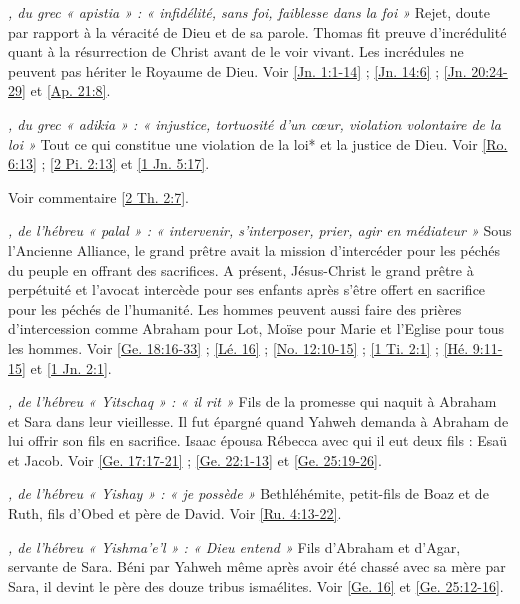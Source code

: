 \begin{multicols}{2}
\textit{, du grec « apistia » : « infidélité, sans foi, faiblesse dans la foi »}\newline
Rejet, doute par rapport à la véracité de Dieu et de sa parole. Thomas fit preuve d'incrédulité quant à la résurrection de Christ avant de le voir vivant. Les incrédules ne peuvent pas hériter le Royaume de Dieu. Voir \vref{Jn. 1:1-14} ; \vref{Jn. 14:6} ; \vref{Jn. 20:24-29} et \vref{Ap. 21:8}.

\textit{, du grec « adikia » : « injustice, tortuosité d'un cœur, violation volontaire de la loi »}\newline
Tout ce qui constitue une violation de la loi* et la justice de Dieu. Voir \vref{Ro. 6:13} ; \vref{2 Pi. 2:13} et \vref{1 Jn. 5:17}.

\textit{}\newline
Voir commentaire \vref{2 Th. 2:7}.

\textit{, de l'hébreu « palal » : « intervenir, s'interposer, prier, agir en médiateur »}\newline
Sous l'Ancienne Alliance, le grand prêtre avait la mission d'intercéder pour les péchés du peuple en offrant des sacrifices. A présent, Jésus-Christ le grand prêtre à perpétuité et l'avocat intercède pour ses enfants après s'être offert en sacrifice pour les péchés de l'humanité. Les hommes peuvent aussi faire des prières d'intercession comme Abraham pour Lot, Moïse pour Marie et l'Eglise pour tous les hommes. Voir \vref{Ge. 18:16-33} ; \vref{Lé. 16} ; \vref{No. 12:10-15} ; \vref{1 Ti. 2:1} ; \vref{Hé. 9:11-15} et \vref{1 Jn. 2:1}.

\textit{, de l'hébreu « Yitschaq » : « il rit »}\newline
Fils de la promesse qui naquit à Abraham et Sara dans leur vieillesse. Il fut épargné quand Yahweh demanda à Abraham de lui offrir son fils en sacrifice. Isaac épousa Rébecca avec qui il eut deux fils : Esaü et Jacob. Voir \vref{Ge. 17:17-21} ; \vref{Ge. 22:1-13} et \vref{Ge. 25:19-26}.

\textit{, de l'hébreu « Yishay » : « je possède »}\newline
Bethléhémite, petit-fils de Boaz et de Ruth, fils d'Obed et père de David. Voir \vref{Ru. 4:13-22}.

\textit{, de l'hébreu « Yishma'e'l » : « Dieu entend »}\newline
Fils d'Abraham et d'Agar, servante de Sara. Béni par Yahweh même après avoir été chassé avec sa mère par Sara, il devint le père des douze tribus ismaélites. Voir \vref{Ge. 16} et \vref{Ge. 25:12-16}.


\end{multicols}
